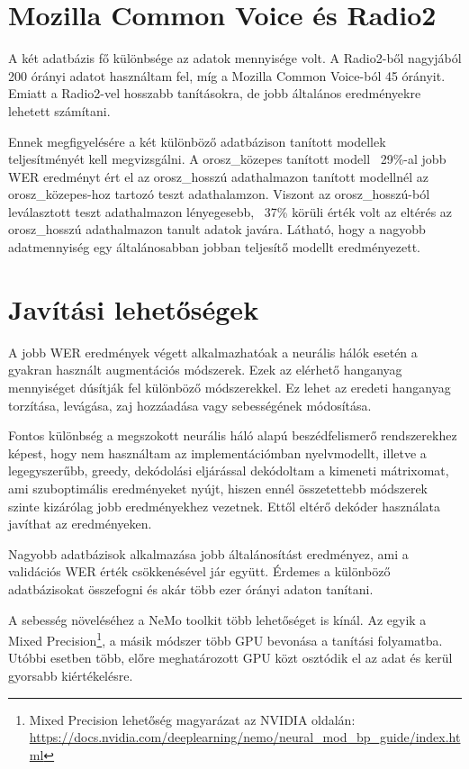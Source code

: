 \section{Mozilla Common Voice és Radio2}

A két adatbázis fő különbsége az adatok mennyisége volt. A Radio2-ből nagyjából 200 órányi adatot használtam fel, míg a Mozilla Common Voice-ból 45 órányit. Emiatt a Radio2-vel hosszabb tanításokra, de jobb általános eredményekre lehetett számítani.

Ennek megfigyelésére a két különböző adatbázison tanított modellek teljesítményét kell megvizsgálni. A orosz\_közepes tanított modell ~29\%-al jobb WER eredményt ért el az orosz\_hosszú adathalmazon tanított modellnél az orosz\_közepes-hoz tartozó teszt adathalamzon. Viszont az orosz\_hosszú-ból leválasztott teszt adathalmazon lényegesebb, ~37\% körüli érték volt az eltérés az orosz\_hosszú adathalmazon tanult adatok javára. Látható, hogy a nagyobb adatmennyiség egy általánosabban jobban teljesítő modellt eredményezett.

\section{Javítási lehetőségek}

A jobb WER eredmények végett alkalmazhatóak a neurális hálók esetén a gyakran használt augmentációs módszerek. Ezek az elérhető hanganyag mennyiséget dúsítják fel különböző módszerekkel. Ez lehet az eredeti hanganyag torzítása, levágása, zaj hozzáadása vagy sebességének módosítása.

Fontos különbség a megszokott neurális háló alapú beszédfelismerő rendszerekhez képest, hogy nem használtam az implementációmban nyelvmodellt, illetve a legegyszerűbb, greedy, dekódolási eljárással dekódoltam a kimeneti mátrixomat, ami szuboptimális eredményeket nyújt, hiszen ennél összetettebb módszerek szinte kizárólag jobb eredményekhez vezetnek\cite{decoder}. Ettől eltérő dekóder használata javíthat az eredményeken.

Nagyobb adatbázisok alkalmazása jobb általánosítást eredményez, ami a validációs WER érték csökkenésével jár együtt. Érdemes a különböző adatbázisokat összefogni és akár több ezer órányi adaton tanítani.

A sebesség növeléséhez a NeMo toolkit több lehetőséget is kínál. Az egyik a Mixed Precision\footnote{Mixed Precision lehetőség magyarázat az NVIDIA oldalán: \url{https://docs.nvidia.com/deeplearning/nemo/neural_mod_bp_guide/index.html}}, a másik módszer több GPU bevonása a tanítási folyamatba. Utóbbi esetben több, előre meghatározott GPU közt osztódik el az adat és kerül gyorsabb kiértékelésre.

